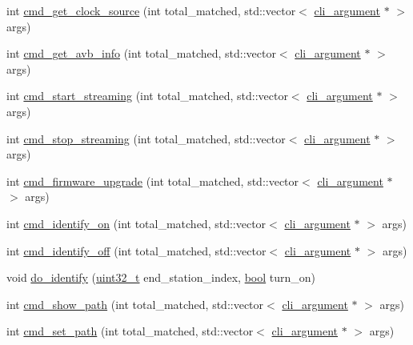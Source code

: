 \begin{DoxyCompactItemize}
\item 
int \hyperlink{classcmd__line_ae80c5fbd5e976997854ba7de5344d2ef}{cmd\+\_\+get\+\_\+clock\+\_\+source} (int total\+\_\+matched, std\+::vector$<$ \hyperlink{classcli__argument}{cli\+\_\+argument} $\ast$ $>$ args)
\item 
int \hyperlink{classcmd__line_a6a09693f01ee0f54f1513195b6d77122}{cmd\+\_\+get\+\_\+avb\+\_\+info} (int total\+\_\+matched, std\+::vector$<$ \hyperlink{classcli__argument}{cli\+\_\+argument} $\ast$ $>$ args)
\item 
int \hyperlink{classcmd__line_a576203de7a50eaf2deda5b7c7ed8ee86}{cmd\+\_\+start\+\_\+streaming} (int total\+\_\+matched, std\+::vector$<$ \hyperlink{classcli__argument}{cli\+\_\+argument} $\ast$ $>$ args)
\item 
int \hyperlink{classcmd__line_a7ab3b0bf5e3be7c1d5abec9aea3322ac}{cmd\+\_\+stop\+\_\+streaming} (int total\+\_\+matched, std\+::vector$<$ \hyperlink{classcli__argument}{cli\+\_\+argument} $\ast$ $>$ args)
\item 
int \hyperlink{classcmd__line_a5c9a5e2f1fa8b53d350bb588894759b0}{cmd\+\_\+firmware\+\_\+upgrade} (int total\+\_\+matched, std\+::vector$<$ \hyperlink{classcli__argument}{cli\+\_\+argument} $\ast$ $>$ args)
\item 
int \hyperlink{classcmd__line_af79a63276ca3c978a748f9491cf006c7}{cmd\+\_\+identify\+\_\+on} (int total\+\_\+matched, std\+::vector$<$ \hyperlink{classcli__argument}{cli\+\_\+argument} $\ast$ $>$ args)
\item 
int \hyperlink{classcmd__line_af43957351c668064746ad16774446b33}{cmd\+\_\+identify\+\_\+off} (int total\+\_\+matched, std\+::vector$<$ \hyperlink{classcli__argument}{cli\+\_\+argument} $\ast$ $>$ args)
\item 
void \hyperlink{classcmd__line_a8a57d2f44b2bcd1061685b1d5fb5b271}{do\+\_\+identify} (\hyperlink{parse_8c_a6eb1e68cc391dd753bc8ce896dbb8315}{uint32\+\_\+t} end\+\_\+station\+\_\+index, \hyperlink{avb__gptp_8h_af6a258d8f3ee5206d682d799316314b1}{bool} turn\+\_\+on)
\item 
int \hyperlink{classcmd__line_aac82b5a0cfcfb2b960130c9f5866c6b8}{cmd\+\_\+show\+\_\+path} (int total\+\_\+matched, std\+::vector$<$ \hyperlink{classcli__argument}{cli\+\_\+argument} $\ast$ $>$ args)
\item 
int \hyperlink{classcmd__line_a89e496f9320fa05b963d18b9b0d34864}{cmd\+\_\+set\+\_\+path} (int total\+\_\+matched, std\+::vector$<$ \hyperlink{classcli__argument}{cli\+\_\+argument} $\ast$ $>$ args)
\item 

\end{DoxyCompactItemize}
